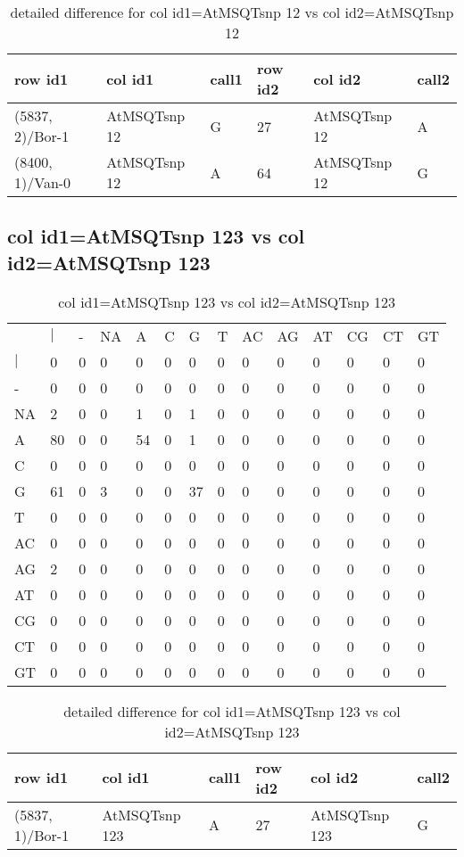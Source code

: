 \begin{center}
\begin{longtable}{|l|l|l|l|l|l|}
\caption{detailed difference for col id1=AtMSQTsnp 12 vs col id2=AtMSQTsnp 12} \label{table_dm503}\\
\hline
row id1&col id1&call1&row id2&col id2&call2\\
\hline
(5837, 2)/Bor-1&AtMSQTsnp 12&G&27&AtMSQTsnp 12&A\\
(8400, 1)/Van-0&AtMSQTsnp 12&A&64&AtMSQTsnp 12&G\\
\hline
\end{longtable}
\end{center}

\subsection{col id1=AtMSQTsnp 123 vs col id2=AtMSQTsnp 123}
\begin{center}
\begin{longtable}{|l|l|l|l|l|l|l|l|l|l|l|l|l|l|}
\caption{col id1=AtMSQTsnp 123 vs col id2=AtMSQTsnp 123} \label{table_dm504}\\
\hline
\\
\hline
&$|$&-&NA&A&C&G&T&AC&AG&AT&CG&CT&GT\\
$|$&0&0&0&0&0&0&0&0&0&0&0&0&0\\
-&0&0&0&0&0&0&0&0&0&0&0&0&0\\
NA&2&0&0&1&0&1&0&0&0&0&0&0&0\\
A&80&0&0&54&0&1&0&0&0&0&0&0&0\\
C&0&0&0&0&0&0&0&0&0&0&0&0&0\\
G&61&0&3&0&0&37&0&0&0&0&0&0&0\\
T&0&0&0&0&0&0&0&0&0&0&0&0&0\\
AC&0&0&0&0&0&0&0&0&0&0&0&0&0\\
AG&2&0&0&0&0&0&0&0&0&0&0&0&0\\
AT&0&0&0&0&0&0&0&0&0&0&0&0&0\\
CG&0&0&0&0&0&0&0&0&0&0&0&0&0\\
CT&0&0&0&0&0&0&0&0&0&0&0&0&0\\
GT&0&0&0&0&0&0&0&0&0&0&0&0&0\\
\hline
\end{longtable}
\end{center}

\begin{center}
\begin{longtable}{|l|l|l|l|l|l|}
\caption{detailed difference for col id1=AtMSQTsnp 123 vs col id2=AtMSQTsnp 123} \label{table_dm505}\\
\hline
row id1&col id1&call1&row id2&col id2&call2\\
\hline
(5837, 1)/Bor-1&AtMSQTsnp 123&A&27&AtMSQTsnp 123&G\\
\hline
\end{longtable}
\end{center}

